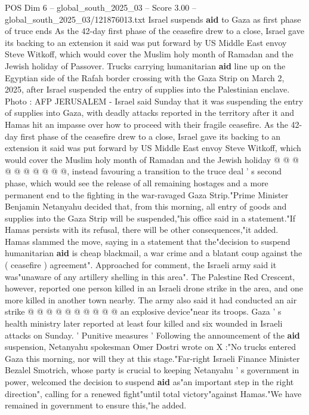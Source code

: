 \begin{textsample}{POS Dim 6 – global\_south\_2025\_03 – Score 3.00 – global\_south\_2025\_03/121876013.txt}  \label{ex:f6_pos_227}
Israel suspends \textbf{aid} to Gaza as first phase of truce ends As the 42-day first phase of the ceasefire drew to a close, Israel gave its backing to an extension it said was put forward by US Middle East envoy Steve Witkoff, which would cover the Muslim holy month of Ramadan and the Jewish holiday of Passover.
Trucks carrying humanitarian \textbf{aid} line up on the Egyptian side of the Rafah border crossing with the Gaza Strip on March 2, 2025, after Israel suspended the entry of supplies into the Palestinian enclave.
Photo : AFP JERUSALEM - Israel said Sunday that it was suspending the entry of supplies into Gaza, with deadly attacks reported in the territory after it and Hamas hit an impasse over how to proceed with their fragile ceasefire.
As the 42-day first phase of the ceasefire drew to a close, Israel gave its backing to an extension it said was put forward by US Middle East envoy Steve Witkoff, which would cover the Muslim holy month of Ramadan and the Jewish holiday @ @ @ @ @ @ @ @ @ @, instead favouring a transition to the truce deal ' s second phase, which would see the release of all remaining hostages and a more permanent end to the fighting in the war-ravaged Gaza Strip."Prime Minister Benjamin Netanyahu decided that, from this morning, all entry of goods and supplies into the Gaza Strip will be suspended,"his office said in a statement."If Hamas persists with its refusal, there will be other consequences,"it added.
Hamas slammed the move, saying in a statement that the"decision to suspend humanitarian \textbf{aid} is cheap blackmail, a war crime and a blatant coup against the ( ceasefire ) agreement".
Approached for comment, the Israeli army said it was"unaware of any artillery shelling in this area".
The Palestine Red Crescent, however, reported one person killed in an Israeli drone strike in the area, and one more killed in another town nearby.
The army also said it had conducted an air strike @ @ @ @ @ @ @ @ @ @ an explosive device"near its troops.
Gaza ' s health ministry later reported at least four killed and six wounded in Israeli attacks on Sunday. ' Punitive measures ' Following the announcement of the \textbf{aid} suspension, Netanyahu spokesman Omer Dostri wrote on X :"No trucks entered Gaza this morning, nor will they at this stage."Far-right Israeli Finance Minister Bezalel Smotrich, whose party is crucial to keeping Netanyahu ' s government in power, welcomed the decision to suspend \textbf{aid} as"an important step in the right direction", calling for a renewed fight"until total victory"against Hamas."We have remained in government to ensure this,"he added.

\end{textsample}
